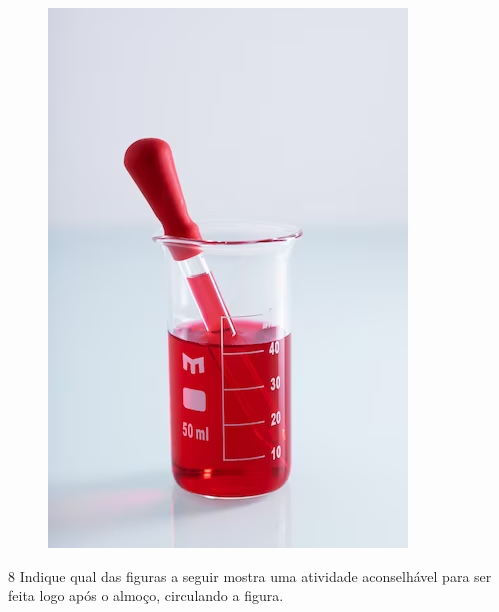 \begin{figure}[htpb!]
\centering
\includegraphics[width=.65\textwidth]{./media/image56.png}
\end{figure}

\pagebreak

\num{8} Indique qual das figuras a seguir mostra uma atividade aconselhável para
ser feita logo após o almoço, circulando a figura.


